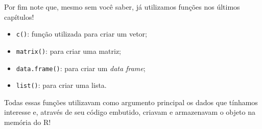 \documentclass[
  letterpaper,
  DIV=11,
  numbers=noendperiod]{scrreprt}
\begin{document}
Por fim note que, mesmo sem você saber, já utilizamos funções nos
últimos capítulos!

\begin{itemize}
\item
  \texttt{c()}: função utilizada para criar um vetor;
\item
  \texttt{matrix()}: para criar uma matriz;
\item
  \texttt{data.frame()}: para criar um \emph{data frame};
\item
  \texttt{list()}: para criar uma lista.
\end{itemize}

Todas essas funções utilizavam como argumento principal os dados que
tínhamos interesse e, através de seu código embutido, criavam e
armazenavam o objeto na memória do R!
\end{document}
